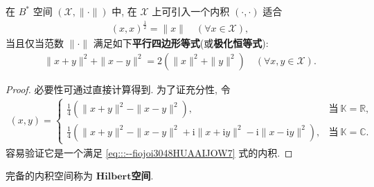 \documentclass[../../main.tex]{subfiles}%
\begin{document}
\begin{proposition}\label{proposition:平行四边形等式--泛函分析}
在 $B^*$ 空间 $(\mathscr{X},\|\cdot\|)$ 中, 在 $\mathscr{X}$ 上可引入一个内积 $(\cdot,\cdot)$ 适合
\begin{align}
(x,x)^\frac{1}{2}=\|x\|\quad(\forall x\in\mathscr{X}),\label{eq:::--fiojoi3048HUAAIJOW7}
\end{align}
当且仅当范数 $\|\cdot\|$ 满足如下\textbf{平行四边形等式}(或\textbf{极化恒等式}):
\begin{align*}
\|x+y\|^2+\|x-y\|^2=2(\|x\|^2+\|y\|^2)\quad(\forall x,y\in\mathscr{X}).
\end{align*}
\end{proposition}
\begin{proof}
必要性可通过直接计算得到. 为了证充分性, 令
\begin{align*}
(x,y)=
\begin{cases}
\frac{1}{4}\left(\|x+y\|^2-\|x-y\|^2\right), & \text{当}\ \mathbb{K}=\mathbb{R}, \\
\frac{1}{4}\left(\|x+y\|^2-\|x-y\|^2+\mathrm{i}\|x+\mathrm{i}y\|^2-\mathrm{i}\|x-\mathrm{i}y\|^2\right), & \text{当}\ \mathbb{K}=\mathbb{C}.
\end{cases}
\end{align*}
容易验证它是一个满足 \eqref{eq:::--fiojoi3048HUAAIJOW7} 式的内积.
\end{proof}

\begin{definition}
完备的内积空间称为 $\mathbf{Hilbert}$\textbf{空间}.
\end{definition}
\end{document}
